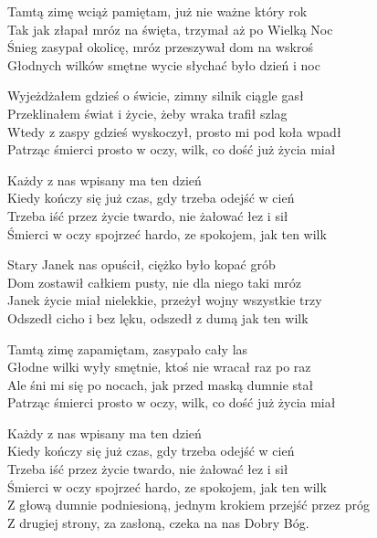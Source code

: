 \begin{text}
\begin{footTwo}
Tamtą zimę wciąż pamiętam, już nie ważne który rok\\
Tak jak złapał mróz na święta, trzymał aż po Wielką Noc\\
Śnieg zasypał okolicę, mróz przeszywał dom na wskroś\\
Głodnych wilków smętne wycie słychać było dzień i noc

Wyjeżdżałem gdzieś o świcie, zimny silnik ciągle gasł\\
Przeklinałem świat i życie, żeby wraka trafił szlag\\
Wtedy z zaspy gdzieś wyskoczył, prosto mi pod koła wpadł\\
Patrząc śmierci prosto w oczy, wilk, co dość już życia miał

\vin Każdy z nas wpisany ma ten dzień\\
\vin Kiedy kończy się już czas, gdy trzeba odejść w cień\\
\vin Trzeba iść przez życie twardo, nie żałować łez i sił\\
\vin Śmierci w oczy spojrzeć hardo, ze spokojem, jak ten wilk

Stary Janek nas opuścił, ciężko było kopać grób\\
Dom zostawił całkiem pusty, nie dla niego taki mróz\\
Janek życie miał nielekkie, przeżył wojny wszystkie trzy\\
Odszedł cicho i bez lęku, odszedł z dumą jak ten wilk

Tamtą zimę zapamiętam, zasypało cały las\\
Głodne wilki wyły smętnie, ktoś nie wracał raz po raz\\
Ale śni mi się po nocach, jak przed maską dumnie stał\\
Patrząc śmierci prosto w oczy, wilk, co dość już życia miał

\vin Każdy z nas wpisany ma ten dzień\\
\vin Kiedy kończy się już czas, gdy trzeba odejść w cień\\
\vin Trzeba iść przez życie twardo, nie żałować łez i sił\\
\vin Śmierci w oczy spojrzeć hardo, ze spokojem, jak ten wilk\\
\vin Z głową dumnie podniesioną, jednym krokiem przejść przez próg\\
\vin Z drugiej strony, za zasłoną, czeka na nas Dobry Bóg.
\end{footTwo}
\end{text}
